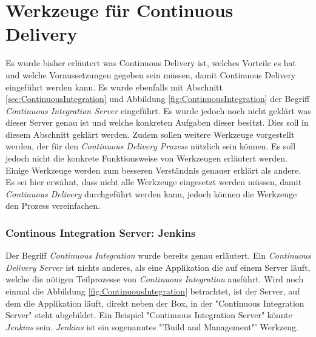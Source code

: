 \section{Werkzeuge für Continuous Delivery}
\label{sec:WerkzeugeCD}
Es wurde bisher erläutert was Continuous Delivery ist, welches Vorteile es hat und welche Voraussetzungen gegeben sein müssen, damit Continuous Delivery eingeführt werden kann. Es wurde ebenfalls mit Abschnitt \ref{sec:ContinuousIntegration}  und Abbildung \ref{fig:ContinuousIntegration}  der Begriff \textit{Continuous Integration Server} eingeführt. Es wurde jedoch noch nicht geklärt was dieser Server genau ist und welche konkreten Aufgaben dieser besitzt. Dies soll in diesem Abschnitt geklärt werden. Zudem sollen weitere Werkzeuge vorgestellt werden, der für den \textit{Continuous Delivery Prozess} nützlich sein können. Es soll jedoch nicht die konkrete Funktionsweise von Werkzeugen erläutert werden. Einige Werkzeuge werden zum besseren Verständnis genauer erklärt als andere.
Es sei hier erwähnt, dass nicht alle Werkzeuge eingesetzt werden müssen, damit \textit{Continuous Delivery} durchgeführt werden kann, jedoch können die Werkzeuge den Prozess vereinfachen.

\subsubsection*{Continous Integration Server: Jenkins}
Der Begriff \textit{Continuous Integration} wurde bereits genau erläutert. Ein \textit{Continuous Delivery Server} ist nichts anderes, als eine Applikation die auf einem Server läuft, welche die nötigen Teilprozesse von \textit{Continuous Integration} ausführt. Wird noch einmal die Abbildung \ref{fig:ContinuousIntegration}  betrachtet, ist der Server, auf dem die Applikation läuft, direkt neben der Box, in der "Continuous Integration Server" steht abgebildet. Ein Beispiel "Continuous Integration Server" könnte \textit{Jenkins} sein. \textit{Jenkins} ist ein sogenanntes "'Build and Management"' Werkzeug.

